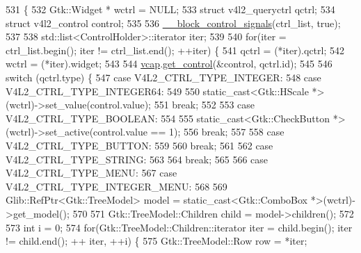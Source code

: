 \begin{DoxyCode}
531                                                                                  \{
532         Gtk::Widget * wctrl = NULL;
533         \textcolor{keyword}{struct }v4l2\_queryctrl qctrl;
534         \textcolor{keyword}{struct }v4l2\_control control;
535 
536         \hyperlink{class_v_s_s_s___g_u_i_1_1_v4_l_interface_a677d3f2d0246528bafd19cf2d3dccf98}{\_\_block\_control\_signals}(ctrl\_list, \textcolor{keyword}{true});
537 
538         std::list<ControlHolder>::iterator iter;
539 
540         \textcolor{keywordflow}{for}(iter = ctrl\_list.begin(); iter != ctrl\_list.end(); ++iter) \{
541             qctrl = (*iter).qctrl;
542             wctrl = (*iter).widget;
543 
544             \hyperlink{class_v_s_s_s___g_u_i_1_1_v4_l_interface_a7ece61f4ccc6d5321c445e60f34e7f33}{vcap}.\hyperlink{classv4lcap_affd6d918400a56e165d7a3e4fab8bdae}{get\_control}(&control, qctrl.id);
545 
546             \textcolor{keywordflow}{switch} (qctrl.type) \{
547                 \textcolor{keywordflow}{case} V4L2\_CTRL\_TYPE\_INTEGER:
548                 \textcolor{keywordflow}{case} V4L2\_CTRL\_TYPE\_INTEGER64:
549 
550                     \textcolor{keyword}{static\_cast<}Gtk::HScale *\textcolor{keyword}{>}(wctrl)->set\_value(control.value);
551                     \textcolor{keywordflow}{break};
552 
553                 \textcolor{keywordflow}{case} V4L2\_CTRL\_TYPE\_BOOLEAN:
554 
555                     \textcolor{keyword}{static\_cast<}Gtk::CheckButton *\textcolor{keyword}{>}(wctrl)->set\_active(control.value == 1);
556                     \textcolor{keywordflow}{break};
557 
558                 \textcolor{keywordflow}{case} V4L2\_CTRL\_TYPE\_BUTTON:
559 
560                     \textcolor{keywordflow}{break};
561 
562                 \textcolor{keywordflow}{case} V4L2\_CTRL\_TYPE\_STRING:
563 
564                     \textcolor{keywordflow}{break};
565 
566                 \textcolor{keywordflow}{case} V4L2\_CTRL\_TYPE\_MENU:
567                 \textcolor{keywordflow}{case} V4L2\_CTRL\_TYPE\_INTEGER\_MENU:
568 
569                     Glib::RefPtr<Gtk::TreeModel> model = \textcolor{keyword}{static\_cast<}Gtk::ComboBox *\textcolor{keyword}{>}(wctrl)->get\_model();
570 
571                     Gtk::TreeModel::Children child = model->children();
572 
573                     \textcolor{keywordtype}{int} i = 0;
574                     \textcolor{keywordflow}{for}(Gtk::TreeModel::Children::iterator iter = child.begin(); iter != child.end(); ++
      iter, ++i) \{
575                         Gtk::TreeModel::Row row = *iter;

\end{DoxyCode}
